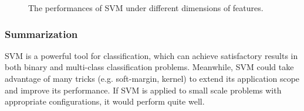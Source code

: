 \documentclass[12pt,a4paper]{article}
\theoremstyle{definition}
\begin{document}
\begin{figure}[H]
	\centering
	\caption{The performances of SVM under different dimensions of features.}
	\label{fig:svm-dim}
\end{figure}

\subsubsection{Summarization}

SVM is a powerful tool for classification, which can achieve satisfactory results in both binary and multi-class classification problems. Meanwhile, SVM could take advantage of many tricks (e.g. soft-margin, kernel) to extend its application scope and improve its performance. If SVM is applied to small scale problems with appropriate configurations, it would perform quite well.
\end{document}
